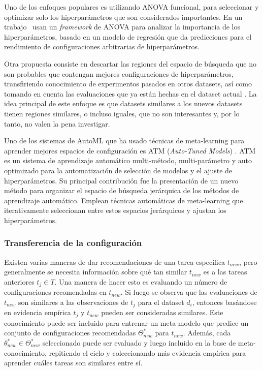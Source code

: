 Uno de los enfoques populares es utilizando ANOVA funcional, para seleccionar y optimizar solo los hiperparámetros que son considerados importantes. En un trabajo~\cite{rijn2018hyp} usan un \textit{framework} de ANOVA para analizar la importancia de los hiperparámetros, basado en un modelo de regresión que da predicciones para el rendimiento de configuraciones arbitrarias de hiperparámetros.

Otra propuesta consiste en descartar las regiones del espacio de búsqueda que no son probables que contengan mejores configuraciones de hiperparámetros, transfiriendo conocimiento de experimentos pasados en otros datasets, así como tomando en cuenta las evaluaciones que ya están hechas en el dataset actual \cite{witsuba2015hyper}.
La idea principal de este enfoque es que datasets similares a los nuevos datasets tienen regiones similares, o incluso iguales, que no son interesantes y, por lo tanto, no valen la pena investigar.

Uno de los sistemas de AutoML que ha usado técnicas de meta-learning para aprender mejores espacios de configuración es ATM (\textit{Auto-Tuned Models}) \cite{mendoza2016towards}. ATM es un sistema de aprendizaje automático multi-método, multi-parámetro y auto optimizado para la automatización de selección de modelos y el ajuste de hiperparámetros. Su principal contribución fue la presentación de un nuevo método para organizar el espacio de búsqueda jerárquica de los métodos de aprendizaje automático. 
 Emplean técnicas automáticas de meta-learning que iterativamente seleccionan entre estos espacios jerárquicos y ajustan los hiperparámetros.

\subsubsection{Transferencia de la configuración}


Existen varias maneras de dar recomendaciones de una tarea específica $t_{new}$, pero generalmente se necesita información sobre qué tan similar $t_{new}$ es a las tareas anteriores $t_j \in T$. Una manera de hacer esto es evaluando un número de configuraciones recomendadas en $t_{new}$. Si luego se observa que las evaluaciones de $t_{new}$
son similares a las observaciones de $t_{j}$  para el dataset $d_i$, entonces basándose en evidencia empírica $t_j$ y $t_{new}$ pueden ser consideradas similares. Este conocimiento puede ser incluido para entrenar un meta-modelo que predice un conjunto de configuraciones recomendadas $\Theta_{new}^*$ para $t_{new}$. Además, cada $\theta^*_{new} \in \Theta_{new}^*$ seleccionado puede ser evaluado y luego incluido en la base de meta-conocimiento, repitiendo el ciclo y coleccionando más evidencia empírica para aprender cuáles tareas son similares entre sí.


